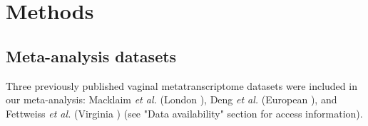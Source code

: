 \documentclass[sn-mathphys,Numbered]{sn-jnl}%
\begin{document}






\section{Methods}\label{sec:secMethods}

\subsection{Meta-analysis datasets} \label{subsec:subsecDatasets}
Three previously published vaginal metatranscriptome datasets were included in our meta-analysis: Macklaim \textit{et al.} (London \cite{Macklaim:2018aa}), Deng \textit{et al.} (European \cite{Denge00262-18}), and Fettweiss \textit{et al.} (Virginia \cite{Fettweis:2019aa}) (see "Data availability" section for access information). 
\end{document}
